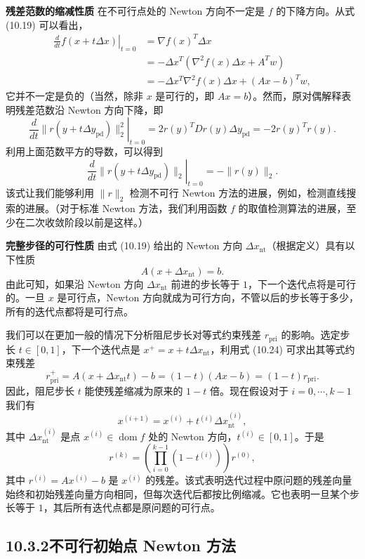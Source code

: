 \documentclass[UTF8, 12pt, fontset=fandol, oneside]{ctexart}
\begin{document}
\noindent\textbf{残差范数的缩减性质}\quad
在不可行点处的 Newton 方向不一定是 $f$ 的下降方向。从式 (10.19) 可以看出，
\[
\begin{aligned}
\left.\frac{d}{dt}f(x+t\Delta x)\right|_{t=0}
&=\nabla f(x)^T\Delta x\\
&=-\Delta x^T(\nabla^2 f(x)\Delta x+A^Tw)\\
&=-\Delta x^T\nabla^2 f(x)\Delta x+(Ax-b)^Tw,
\end{aligned}
\]
它并不一定是负的（当然，除非 $x$ 是可行的，即 $Ax=b$）。然而，原对偶解释表明残差范数沿 Newton 方向下降，即
\[
\left.\frac{d}{dt}\|r(y+t\Delta y_{\mathrm{pd}})\|_2^2\right|_{t=0}
=2r(y)^TDr(y)\Delta y_{\mathrm{pd}}
=-2r(y)^Tr(y).
\]
利用上面范数平方的导数，可以得到
\begin{equation}
\left.\frac{d}{dt}\|r(y+t\Delta y_{\mathrm{pd}})\|_2\right|_{t=0}
=-\|r(y)\|_2.
\tag{10.23}
\end{equation}
该式让我们能够利用 $\|r\|_2$ 检测不可行 Newton 方法的进展，例如，检测直线搜索的进展。（对于标准 Newton 方法，我们利用函数 $f$ 的取值检测算法的进展，至少在二次收敛阶段以前是这样。）

\noindent\textbf{完整步径的可行性质}\quad
由式 (10.19) 给出的 Newton 方向 $\Delta x_{\mathrm{nt}}$（根据定义）具有以下性质
\begin{equation}
A(x+\Delta x_{\mathrm{nt}})=b.
\tag{10.24}
\end{equation}
由此可知，如果沿 Newton 方向 $\Delta x_{\mathrm{nt}}$ 前进的步长等于 $1$，下一个迭代点将是可行的。一旦 $x$ 是可行点，Newton 方向就成为可行方向，不管以后的步长等于多少，所有的迭代点都将是可行点。

我们可以在更加一般的情况下分析阻尼步长对等式约束残差 $r_{\mathrm{pri}}$ 的影响。选定步长 $t\in[0,1]$，下一个迭代点是 $x^+=x+t\Delta x_{\mathrm{nt}}$，利用式 (10.24) 可求出其等式约束残差
\[
r_{\mathrm{pri}}^+=A(x+\Delta x_{\mathrm{nt}}t)-b=(1-t)(Ax-b)=(1-t)r_{\mathrm{pri}}.
\]
因此，阻尼步长 $t$ 能使残差缩减为原来的 $1-t$ 倍。现在假设对于 $i=0,\cdots,k-1$ 我们有
\[
x^{(i+1)}=x^{(i)}+t^{(i)}\Delta x_{\mathrm{nt}}^{(i)},
\]
其中 $\Delta x_{\mathrm{nt}}^{(i)}$ 是点 $x^{(i)}\in\operatorname{dom} f$ 处的 Newton 方向，$t^{(i)}\in[0,1]$。于是
\[
r^{(k)}=\left(\prod_{i=0}^{k-1}(1-t^{(i)})\right)r^{(0)},
\]
其中 $r^{(i)}=Ax^{(i)}-b$ 是 $x^{(i)}$ 的残差。该式表明迭代过程中原问题的残差向量始终和初始残差向量方向相同，但每次迭代后都按比例缩减。它也表明一旦某个步长等于 $1$，其后所有迭代点都是原问题的可行点。

\subsection*{10.3.2\quad 不可行初始点 Newton 方法}
\end{document}
